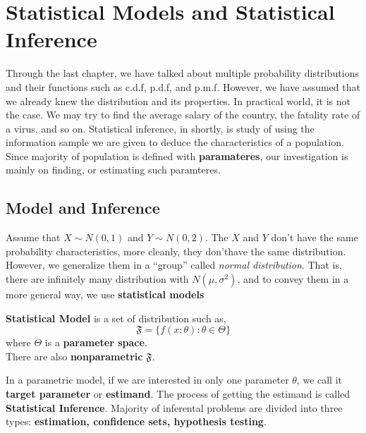 \chapter{Statistical Models and Statistical Inference}
Through the last chapter, we have talked about multiple probability distributions and their functions such as c.d.f, p.d.f, and p.m.f. 
However, we have assumed that we already knew the distribution and its properties. In practical world, it is not the case.
We may try to find the average salary of the country, the fatality rate of a virus, and so on.
Statistical inference, in shortly, is study of using the information sample we are given to deduce the characteristics of a population.
Since majority of population is defined with \textbf{paramateres}, our investigation is mainly on finding, or estimating such paramteres.



\section{Model and Inference}
Assume that $ X \sim N(0,1)$ and $Y \sim N(0,2)$. The $X$ and $Y$ don't have the same probability characteristics, more cleanly, they don'thave the same distribution. However, we generalize them in a ``group'' called \textit{normal distribution}. That is, there are infinitely many distribution with $N(\mu, \sigma^2)$, and to convey them in a more general way, we use \textbf{statistical models}
\begin{definition}
    \textbf{Statistical Model} is a set of distribution such as,
    \[ \mathfrak{F} = \biggl \{ f(x; \theta ): \theta \in \Theta \biggr \} \]
    where $\Theta$ is a \textbf{parameter space}.\\
    There are also \textbf{nonparametric} $\mathfrak{F}$. 
\end{definition}
In a parametric model, if we are interested in only one parameter $\theta$, we call it \textbf{target parameter} or \textbf{estimand}.  The process of getting the estimand is called \textbf{Statistical Inference}. Majority of inferental problems are divided into three types: \textbf{estimation, confidence sets, hypothesis testing}.


